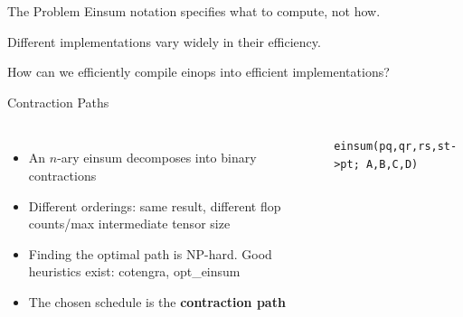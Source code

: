 \documentclass[aspectratio=169,10pt]{beamer}
\newcommand{\einl}[1]{{\footnotesize\texttt{#1}}}
\begin{document}
\begin{frame}{The Problem}
	Einsum notation specifies what to compute, not how.
	
	Different implementations vary widely in their efficiency.
	
	How can we efficiently compile einops into efficient implementations?
	
\end{frame}


\begin{frame}{Contraction Paths}

\begin{columns}[T]
\begin{itemize}
  \item An $n$-ary einsum decomposes into binary contractions
  \item Different orderings: same result, different flop counts/max intermediate tensor size
  \item Finding the optimal path is \alert{NP-hard}.
        Good heuristics exist: cotengra, opt\_einsum
  \item The chosen schedule is the \textbf{contraction path}
\end{itemize}

\pause
{}
\einl{einsum(pq,qr,rs,st->pt; A,B,C,D)}

\medskip
{}

\end{columns}
\end{frame}
\end{document}
